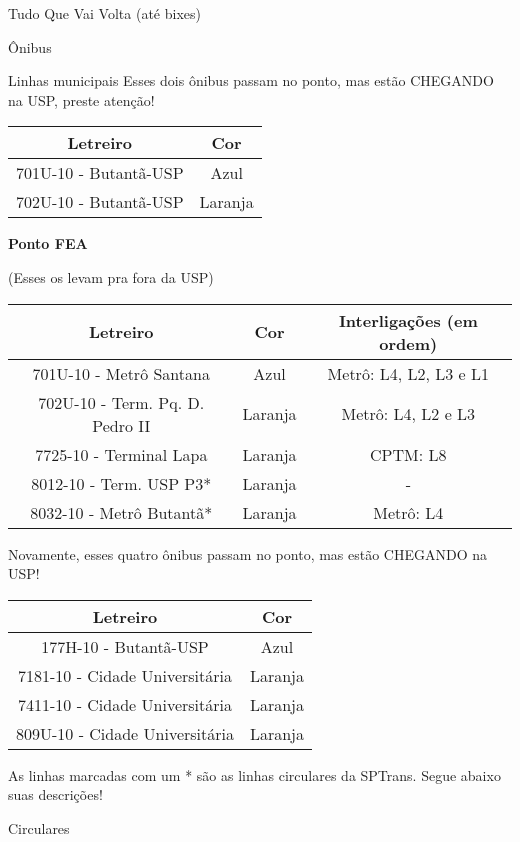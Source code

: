 \begin{secao}{Tudo Que Vai Volta (até bixes)}
\begin{subsecao}{Ônibus}
\begin{subsubsecao}{Linhas municipais}
Esses dois ônibus passam no ponto, mas estão CHEGANDO na USP, preste 
atenção!

\begin{center}
	\begin{tabular}{|c|c|}
	  \hline
	  Letreiro & Cor\\
	  \hline
	  701U-10 - Butantã-USP & Azul\\
	  702U-10 - Butantã-USP & Laranja\\
	  \hline
	\end{tabular}
\end{center}

{\bf Ponto FEA}

(Esses os levam pra fora da USP)
\begin{center}
	\begin{tabular}{|c|c|c|}
      \hline
	  Letreiro & Cor & Interligações (em ordem)\\
	  \hline
	  701U-10 - Metrô Santana & Azul & Metrô: L4, L2, L3 e L1\\
	  702U-10 - Term. Pq. D. Pedro II & Laranja & Metrô: L4, L2 e L3\\
	  7725-10 - Terminal Lapa & Laranja & CPTM: L8\\
	  8012-10 - Term. USP P3* & Laranja & -\\
	  8032-10 - Metrô Butantã* & Laranja & Metrô: L4\\
      \hline
	\end{tabular}
\end{center}

Novamente, esses quatro ônibus passam no ponto, mas estão CHEGANDO na USP!
\begin{center}
	\begin{tabular}{|c|c|}
	  \hline
	  Letreiro & Cor\\
	  \hline
	  177H-10 - Butantã-USP & Azul\\
	  7181-10 - Cidade Universitária & Laranja\\
	  7411-10 - Cidade Universitária & Laranja\\
	  809U-10 - Cidade Universitária & Laranja\\
	  \hline
	\end{tabular}
\end{center}

As linhas marcadas com um * são as linhas circulares da SPTrans.
Segue abaixo suas descrições!

\end{subsubsecao}

\begin{subsubsecao}{Circulares}


\end{subsubsecao}
\end{subsecao}
\end{secao}
